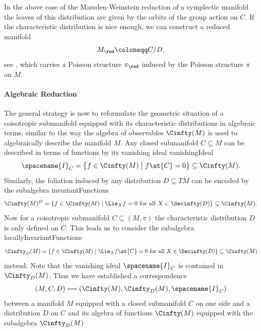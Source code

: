 \documentclass{memoir}
\newcommand{\vanishing}{\spacename{I}}
\begin{document}
In the above case of the Marsden-Weinstein reduction of a symplectic manifold the leaves of this distribution
are given by the orbits of the group action on $C$.
If the characteristic distribution is nice enough, we can construct a reduced manifold
\begin{equation}
	M_\red \coloneqq C / D,
\end{equation}
see \cite[fig:ConstraintManifold]{Dippell2023}, which carries a Poisson structure $\pi_\red$ induced by the Poisson structure $\pi$ on $M$.


\paragraph{Algebraic Reduction}
The general strategy is now to reformulate the geometric situation of a coisotropic submanifold equipped with its characteristic distributions in algebraic terms, similar to the way the algebra of observables $\Cinfty(M)$ is used to algebraically describe the manifold $M$.
Any closed submanifold $C \subseteq M$ can be described in terms of functions by its vanishing ideal
 {vanishingIdeal}
\begin{equation}
	\vanishing_C = \left\{ f \in \Cinfty(M) \bigm| f\at{C} = 0 \right\} \subseteq \Cinfty(M).
\end{equation}
Similarly, the foliation induced by any distribution $D \subseteq TM$ can be encoded by the subalgebra
 {invariantFunctions}
\begin{equation}
	\Cinfty(M)^D = \{ f \in \Cinfty(M) \mid \Lie_X f = 0 \text{ for all } X \in \Secinfty(D) \} \subseteq \Cinfty(M).
\end{equation}
Now for a coisotropic submanifold $C \subseteq (M,\pi)$ the characteristic distribution $D$ is only defined on $C$.
This leads us to consider the subalgebra
 {locallyInvariantFunctions}
\begin{equation}
	\Cinfty_D(M) = \{ f \in \Cinfty(M) \mid \Lie_X f\at{C} = 0 \text{ for all } X \in \Secinfty(D) \} \subseteq \Cinfty(M)
\end{equation}
instead.
Note that the vanishing ideal $\vanishing_C$ is contained in $\Cinfty_D(M)$.
Thus we have established a correspondence
\begin{equation} \label{eq:GeometryAlgebraCorrespondenceConstraint}
	(M,C,D)  \leftrightsquigarrow (\Cinfty(M), \Cinfty_D(M), \vanishing_C)
\end{equation}
between a manifold $M$ equipped with a closed submanifold $C$ on one side and a distribution $D$ on $C$ and
its algebra of functions $\Cinfty(M)$ equipped with the subalgebra $\Cinfty_D(M)$
\end{document}
